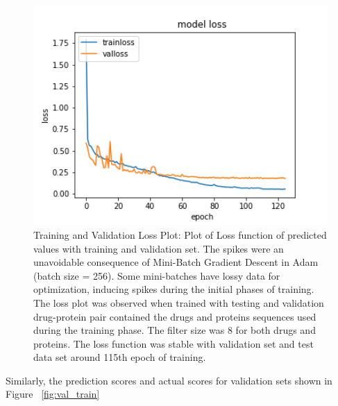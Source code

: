 \begin{figure}
    \centering
    \includegraphics[width=1\textwidth]{mainmatter/4-Results/images/S1_loss.png}
    \caption[Training Loss Plot]{
        Training and Validation Loss Plot: Plot of Loss function of predicted values with training and validation set. The spikes were an unavoidable consequence of Mini-Batch Gradient Descent in Adam (batch size = 256). Some mini-batches have lossy data for optimization, inducing spikes during the initial phases of training. The loss plot was observed when trained with testing and validation drug-protein pair contained the drugs and proteins sequences used during the training phase. The filter size was 8 for both drugs and proteins. The loss function was stable with validation set and test data set around 115th epoch of training.
    }
    \label{fig:train_val_loss_plot}
\end{figure}

\iffalse

Similarly, the prediction scores and actual scores for validation sets  shown in Figure ~\ref{fig:val_train}


